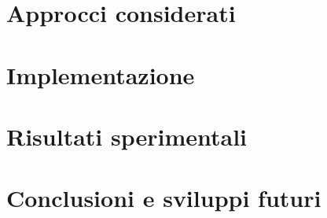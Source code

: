 \documentclass[12pt,a4paper, twoside, openright]{report}
\begin{document}
\chapter{Approcci considerati}


\chapter{Implementazione}


\chapter{Risultati sperimentali}


\chapter{Conclusioni e sviluppi futuri}




\end{document}
